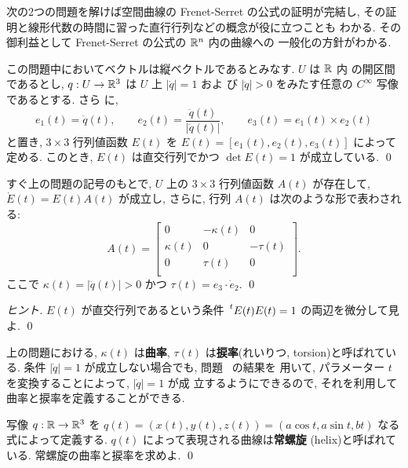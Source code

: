 \documentclass[12pt,twoside]{jarticle}
\begin{document}
次の2つの問題を解けば空間曲線の Frenet-Serret の公式の証明が完結し,
その証明と線形代数の時間に習った直行行列などの概念が役に立つことも
わかる. その御利益として Frenet-Serret の公式の ${\mathbb R}^n$ 内の曲線への
一般化の方針がわかる.

\begin{question}\label{q:FS1}
  この問題中においてベクトルは縦ベクトルであるとみなす. $U$ は ${\mathbb R}$ 内
  の開区間であるとし, $q : U \to {\mathbb R}^3$ は $U$ 上 $|\dot{q}| = 1$ およ
  び $|\ddot{q}| > 0$ をみたす任意の $C^\infty$ 写像であるとする. さら
  に, 
  \[
    e_1(t) = \dot{q}(t),
    \qquad
    e_2(t) = \frac{\ddot{q}(t)}{|\ddot{q}(t)|},
    \qquad
    e_3(t) = e_1(t) \times e_2(t)
  \]%
  と置き, $3\times 3$ 行列値函数 $E(t)$ を %
  $E(t) = [e_1(t), e_2(t), e_3(t)]$ によって定める. このとき, $E(t)$ %
  は直交行列でかつ $\det E(t) = 1$ が成立している. \qed
\end{question}

\begin{question}\label{q:FS2}
  すぐ上の問題の記号のもとで, $U$ 上の $3 \times 3$ 行列値函数 $A(t)$ 
  が存在して, $\dot{E}(t) = E(t) A(t)$ が成立し, さらに, 行列 $A(t)$ 
  は次のような形で表わされる:
  \[
    A(t)
    =
    \begin{bmatrix}
          0     &  - \kappa(t) &    0      \\
       \kappa(t) &       0      & - \tau(t) \\
          0     &     \tau(t)  &    0      \\
    \end{bmatrix}.
  \]%
  ここで $\kappa(t) = |\ddot{q}(t)| > 0$ 
  かつ $\tau(t) = e_3\cdot\dot{e}_2$. \qed
\end{question}

\begin{proof}[ヒント]
$E(t)$ が直交行列であるという条件 %
$\transpose{E(t)} E(t) = 1$ の両辺を微分して見よ. 
\qed 
\end{proof}

上の問題における, $\kappa(t)$ は{\bf 曲率}, %
$\tau(t)$ は{\bf 捩率}(れいりつ, torsion)と呼ばれている. %
条件 $|\dot{q}| = 1$ が成立しない場合でも, 問題 \ の結果を
用いて, パラメーター $t$ を変換することによって, $|\dot{q}| = 1$ が成
立するようにできるので, それを利用して曲率と捩率を定義することができる.

\begin{question}[常螺旋]\label{q:helix}
  写像 $q : {\mathbb R} \to {\mathbb R}^3$ を %
  $q(t) = (x(t), y(t), z(t)) = (a \cos t, a \sin t, b t)$ %
  なる式によって定義する. $q(t)$ によって表現される曲線は{\bf 常螺旋}
  (helix)と呼ばれている. 常螺旋の曲率と捩率を求めよ. \qed
\end{question}
\end{document}

